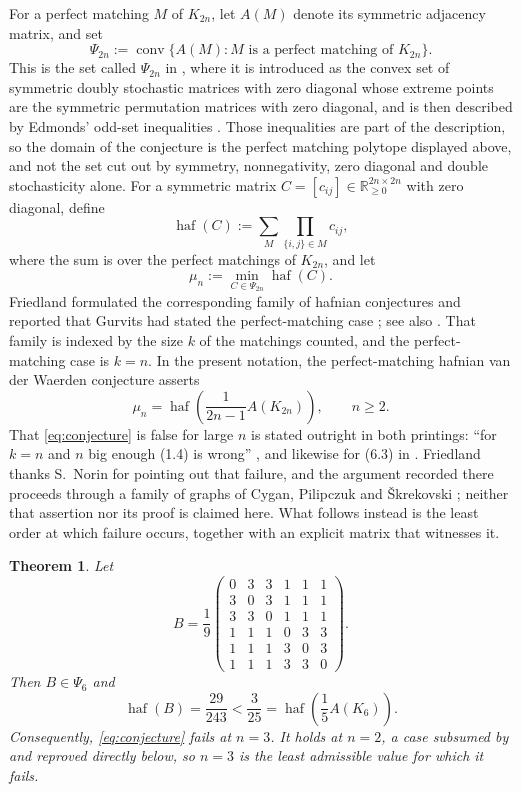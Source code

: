 \documentclass[11pt]{amsart}
\newcommand{\haf}{\operatorname{haf}}
\newcommand{\conv}{\operatorname{conv}}
\newtheorem{theorem}{Theorem}
\theoremstyle{remark}
\begin{document}
For a perfect matching $M$ of $K_{2n}$, let $A(M)$ denote its symmetric
adjacency matrix, and set
\[
  \Psi_{2n}:=
  \conv\{A(M):M\text{ is a perfect matching of }K_{2n}\}.
\]
This is the set called $\Psi_{2n}$ in \cite{Friedland2011,Friedland2012}, where
it is introduced as the convex set of symmetric doubly stochastic matrices with
zero diagonal whose extreme points are the symmetric permutation matrices with
zero diagonal, and is then described by Edmonds' odd-set inequalities
\cite[Eq.~(1.2)]{Friedland2011}. Those inequalities are part of the
description, so the domain of the conjecture is the perfect matching polytope
displayed above, and not the set cut out by symmetry, nonnegativity, zero
diagonal and double stochasticity alone.
For a symmetric matrix
$C=[c_{ij}]\in\mathbb R_{\ge0}^{2n\times2n}$ with zero diagonal, define
\[
  \haf(C):=
  \sum_M\prod_{\{i,j\}\in M}c_{ij},
\]
where the sum is over the perfect matchings of $K_{2n}$, and let
\[
  \mu_n:=\min_{C\in\Psi_{2n}}\haf(C).
\]
Friedland formulated the corresponding family of hafnian conjectures and
reported that Gurvits had stated the perfect-matching case
\cite[Eq.~(1.4) and the discussion following it]{Friedland2011}; see also
\cite[Eq.~(6.3)]{Friedland2012}. That family is indexed by the size $k$ of the
matchings counted, and the perfect-matching case is $k=n$. In the present
notation, the perfect-matching hafnian van der Waerden conjecture asserts
\begin{equation}\label{eq:conjecture}
  \mu_n=
  \haf\!\left(\frac{1}{2n-1}A(K_{2n})\right),
  \qquad n\ge2.
\end{equation}
That \eqref{eq:conjecture} is false for large $n$ is stated outright in both
printings: ``for $k=n$ and $n$ big enough (1.4) is wrong''
\cite[following Eq.~(1.4)]{Friedland2011}, and likewise for (6.3) in
\cite[\S6]{Friedland2012}. Friedland thanks S.~Norin for pointing out that
failure, and the argument recorded there proceeds through a family of graphs of
Cygan, Pilipczuk and \v{S}krekovski \cite{CPS}; neither that assertion nor its
proof is claimed here.
What follows instead is the least order at which failure occurs, together with
an explicit matrix that witnesses it.

\begin{theorem}\label{thm:main}
Let
\[
B=\frac{1}{9}
\begin{pmatrix}
0&3&3&1&1&1\\
3&0&3&1&1&1\\
3&3&0&1&1&1\\
1&1&1&0&3&3\\
1&1&1&3&0&3\\
1&1&1&3&3&0
\end{pmatrix}.
\]
Then $B\in\Psi_6$ and
\[
  \haf(B)=\frac{29}{243}
  <\frac{3}{25}
  =\haf\!\left(\frac{1}{5}A(K_6)\right).
\]
Consequently, \eqref{eq:conjecture} fails at $n=3$. It holds at $n=2$, a case
subsumed by \cite[Lemma~3.1]{Friedland2011} and reproved directly below, so
$n=3$ is the least admissible value for which it fails.
\end{theorem}
\end{document}
